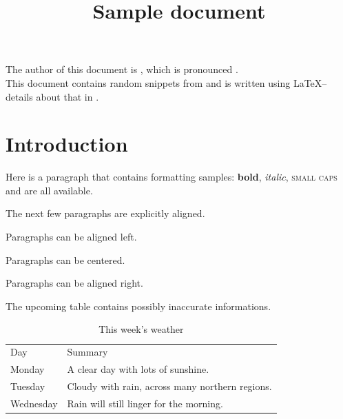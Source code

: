 \documentclass{Metanorma}
\title{Sample document}
\begin{document}
  \maketitle
  \tableofcontents
  \bigskip

  The author of this document is , which is pronounced
  .\\ This document contains random snippets
  from \cite{ISO7301} and is written using \LaTeX --
  details about that in \cite{knuthwebsite}.


  \section{Introduction}

  Here is a paragraph that contains formatting samples: \textbf{bold},
  \textit{italic}, \textsc{small caps} and 
  are all available.

  \begin{note}
    The next few paragraphs are explicitly aligned.
  \end{note}

  \begin{flushleft}
    Paragraphs can be aligned left.
  \end{flushleft}

  \begin{center}
    Paragraphs can be centered.
  \end{center}

  \begin{flushright}
    Paragraphs can be aligned right.
  \end{flushright}

  \begin{caution}
    The upcoming table contains possibly inaccurate informations.
  \end{caution}

  \begin{table}\label{tab:example}
    \caption{This week's weather}
    \begin{tabular}{ll}
      Day & Summary \\
      Monday & A clear day with lots of sunshine.\\
      Tuesday & Cloudy with rain, across many northern regions.\\
      Wednesday & Rain will still linger for the morning.\\
    \end{tabular}
  \end{table}
\end{document}
